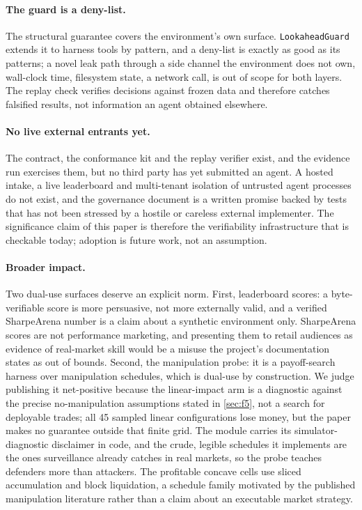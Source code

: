 \paragraph{The guard is a deny-list.} The structural guarantee covers the environment's own surface. \texttt{LookaheadGuard} extends it to harness tools by pattern, and a deny-list is exactly as good as its patterns; a novel leak path through a side channel the environment does not own, wall-clock time, filesystem state, a network call, is out of scope for both layers. The replay check verifies decisions against frozen data and therefore catches falsified results, not information an agent obtained elsewhere.

\paragraph{No live external entrants yet.} The contract, the conformance kit and the replay verifier exist, and the evidence run exercises them, but no third party has yet submitted an agent. A hosted intake, a live leaderboard and multi-tenant isolation of untrusted agent processes do not exist, and the governance document is a written promise backed by tests that has not been stressed by a hostile or careless external implementer. The significance claim of this paper is therefore the verifiability infrastructure that is checkable today; adoption is future work, not an assumption.

\paragraph{Broader impact.} Two dual-use surfaces deserve an explicit norm. First, leaderboard scores: a byte-verifiable score is more persuasive, not more externally valid, and a verified SharpeArena number is a claim about a synthetic environment only. SharpeArena scores are not performance marketing, and presenting them to retail audiences as evidence of real-market skill would be a misuse the project's documentation states as out of bounds. Second, the manipulation probe: it is a payoff-search harness over manipulation schedules, which is dual-use by construction. We judge publishing it net-positive because the linear-impact arm is a diagnostic against the precise no-manipulation assumptions stated in \cref{sec:f5}, not a search for deployable trades; all 45 sampled linear configurations lose money, but the paper makes no guarantee outside that finite grid. The module carries its simulator-diagnostic disclaimer in code, and the crude, legible schedules it implements are the ones surveillance already catches in real markets, so the probe teaches defenders more than attackers. The profitable concave cells use sliced accumulation and block liquidation, a schedule family motivated by the published manipulation literature rather than a claim about an executable market strategy.

